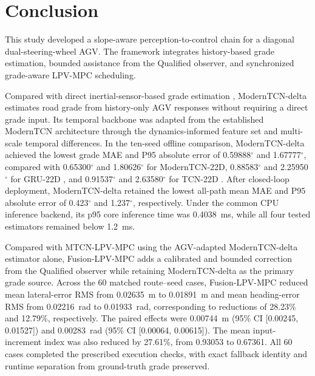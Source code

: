 \documentclass{ieeeaccess}
\newcommand{\citep}[1]{\cite{#1}}
\begin{document}
\section{Conclusion}
\label{sec:conclusion}


This study developed a slope-aware perception-to-control chain for a diagonal
dual-steering-wheel AGV. The framework integrates history-based grade
estimation, bounded assistance from the Qualified observer, and synchronized
grade-aware LPV-MPC scheduling.

Compared with direct inertial-sensor-based grade estimation
\citep{Jauch2018IMUGradeOrientation,Li2022QuaternionUKFGrade,
Kim2023InertialRoadPitch}, ModernTCN-delta estimates road grade from
history-only AGV responses without requiring a direct grade input. Its temporal
backbone was adapted from the established ModernTCN architecture
\citep{Luo2024ModernTCN} through the dynamics-informed feature set and
multi-scale temporal differences. In the ten-seed offline comparison,
ModernTCN-delta achieved the lowest grade MAE and P95 absolute error of
0.59888$^{\circ}$ and 1.67777$^{\circ}$, compared with 0.65300$^{\circ}$ and
1.80626$^{\circ}$ for ModernTCN-22D, 0.88583$^{\circ}$ and
2.25950$^{\circ}$ for GRU-22D \citep{Cho2014GRU}, and 0.91537$^{\circ}$ and
2.63580$^{\circ}$ for TCN-22D \citep{Bai2018TCN,Cao2021TCNRSA}. After
closed-loop deployment, ModernTCN-delta retained the lowest all-path mean MAE
and P95 absolute error of 0.423$^{\circ}$ and 1.237$^{\circ}$, respectively.
Under the common CPU inference backend, its p95 core inference time was
0.4038~ms, while all four tested estimators remained below 1.2~ms.

Compared with MTCN-LPV-MPC using the AGV-adapted ModernTCN-delta estimator
alone, Fusion-LPV-MPC adds a calibrated and bounded correction from the
Qualified observer while retaining ModernTCN-delta as the primary grade source.
Across the 60 matched route--seed cases, Fusion-LPV-MPC reduced mean
lateral-error RMS from 0.02635~m to 0.01891~m and mean heading-error RMS from
0.02216~rad to 0.01933~rad, corresponding to reductions of 28.23\% and
12.79\%, respectively. The paired effects were 0.00744~m (95\% CI [0.00245,
0.01527]) and 0.00283~rad (95\% CI [0.00064, 0.00615]). The mean
input-increment index was also reduced by 27.61\%, from 0.93053 to 0.67361.
All 60 cases completed the prescribed execution checks, with exact fallback
identity and runtime separation from ground-truth grade preserved.
\end{document}
